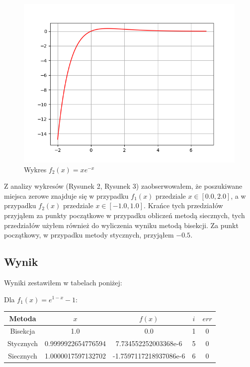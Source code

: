 \begin{figure}[!htbp]
  \centering  
  \includegraphics[totalheight=6cm]{../plots/ex6_f_2.png}
  \caption{Wykres $f_2(x) = xe^{-x}$}
\end{figure}


Z analizy wykresów (Rysunek 2, Rysunek 3) zaobserwowałem, że poszukiwane miejsca zerowe znajduje się w przypadku $ f_1(x) $ przedziale $ x \in [0.0, 2.0] $, a w przypadku $ f_2(x) $ przedziale $ x \in [-1.0, 1.0] $. Krańce tych przedziałów przyjąłem za punkty początkowe w przypadku obliczeń metodą siecznych, tych przedziałów użyłem również do wyliczenia wyniku metodą bisekcji. Za punkt początkowy, w przypadku metody stycznych, przyjąłem $ -0.5 $.
\newpage
\subsection{Wynik}
Wyniki zestawiłem w tabelach poniżej: \\
\begin{center}
Dla $f_1(x) = e^{1 - x} - 1$: \\
\end{center}

\begin{center}
  \begin{tabular}{|c|c|c|c|c|}
    \hline 
      Metoda & $x$ & $ f(x)$ & $i$ & $err$ \\
    \hline
    Bisekcja & 1.0 & 0.0 & 1 & 0\\
    \hline 
    Stycznych & 0.9999922654776594 & 7.734552252003368e-6 & 5 & 0\\
    \hline  
    Siecznych & 1.0000017597132702 & -1.7597117218937086e-6 & 6 & 0 \\
    \hline
  \end{tabular} 
\end{center}

